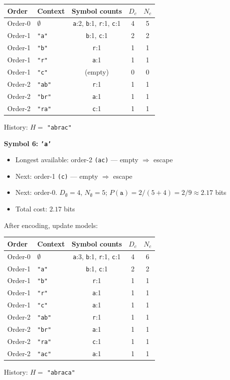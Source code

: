 \begin{examplebox}
\begin{center}
\footnotesize
\begin{tabular}{|l|l|c|c|c|}
\hline
\textbf{Order} & \textbf{Context} & \textbf{Symbol counts} & $D_c$ & $N_c$ \\
\hline
Order-0 & $\emptyset$ & \texttt{a}:2, \texttt{b}:1, \texttt{r}:1, \texttt{c}:1 & 4 & 5 \\
Order-1 & \texttt{"a"} & \texttt{b}:1, \texttt{c}:1 & 2 & 2 \\
Order-1 & \texttt{"b"} & \texttt{r}:1 & 1 & 1 \\
Order-1 & \texttt{"r"} & \texttt{a}:1 & 1 & 1 \\
Order-1 & \texttt{"c"} & (empty) & 0 & 0 \\
Order-2 & \texttt{"ab"} & \texttt{r}:1 & 1 & 1 \\
Order-2 & \texttt{"br"} & \texttt{a}:1 & 1 & 1 \\
Order-2 & \texttt{"ra"} & \texttt{c}:1 & 1 & 1 \\
\hline
\end{tabular}
\end{center}
History: $H =$ \texttt{"abrac"}

\bigskip
\textbf{Symbol 6: \texttt{'a'}}
\begin{itemize}
    \item Longest available: order-2 \texttt{(ac)} — empty $\Rightarrow$ escape
    \item Next: order-1 \texttt{(c)} — empty $\Rightarrow$ escape
    \item Next: order-0. $D_{\emptyset}=4$, $N_{\emptyset}=5$; $P(\texttt{a}) = 2/(5+4) = 2/9 \approx 2.17$ bits
    \item Total cost: $2.17$ bits
\end{itemize}
After encoding, update models:

\begin{center}
\footnotesize
\begin{tabular}{|l|l|c|c|c|}
\hline
\textbf{Order} & \textbf{Context} & \textbf{Symbol counts} & $D_c$ & $N_c$ \\
\hline
Order-0 & $\emptyset$ & \texttt{a}:3, \texttt{b}:1, \texttt{r}:1, \texttt{c}:1 & 4 & 6 \\
Order-1 & \texttt{"a"} & \texttt{b}:1, \texttt{c}:1 & 2 & 2 \\
Order-1 & \texttt{"b"} & \texttt{r}:1 & 1 & 1 \\
Order-1 & \texttt{"r"} & \texttt{a}:1 & 1 & 1 \\
Order-1 & \texttt{"c"} & \texttt{a}:1 & 1 & 1 \\
Order-2 & \texttt{"ab"} & \texttt{r}:1 & 1 & 1 \\
Order-2 & \texttt{"br"} & \texttt{a}:1 & 1 & 1 \\
Order-2 & \texttt{"ra"} & \texttt{c}:1 & 1 & 1 \\
Order-2 & \texttt{"ac"} & \texttt{a}:1 & 1 & 1 \\
\hline
\end{tabular}
\end{center}
History: $H =$ \texttt{"abraca"}


\end{examplebox}
